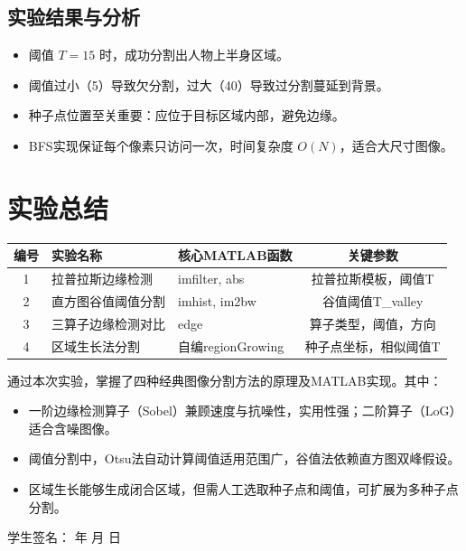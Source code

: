 \documentclass[12pt,a4paper]{article}
\begin{document}
	\subsection{实验结果与分析}
	\begin{itemize}
		\item 阈值 \(T=15\) 时，成功分割出人物上半身区域。
		\item 阈值过小（5）导致欠分割，过大（40）导致过分割蔓延到背景。
		\item 种子点位置至关重要：应位于目标区域内部，避免边缘。
		\item BFS实现保证每个像素只访问一次，时间复杂度 \(O(N)\)，适合大尺寸图像。
	\end{itemize}
	
	\section{实验总结}
	
	\begin{table}[H]
		\centering
		\begin{tabular}{cllc}
			\toprule
			编号 & 实验名称 & 核心MATLAB函数 & 关键参数 \\
			\midrule
			1 & 拉普拉斯边缘检测 & imfilter, abs & 拉普拉斯模板，阈值T \\
			2 & 直方图谷值阈值分割 & imhist, im2bw & 谷值阈值T\_valley \\
			3 & 三算子边缘检测对比 & edge & 算子类型，阈值，方向 \\
			4 & 区域生长法分割 & 自编regionGrowing & 种子点坐标，相似阈值T \\
			\bottomrule
		\end{tabular}
	\end{table}
	
	通过本次实验，掌握了四种经典图像分割方法的原理及MATLAB实现。其中：
	\begin{itemize}
		\item 一阶边缘检测算子（Sobel）兼顾速度与抗噪性，实用性强；二阶算子（LoG）适合含噪图像。
		\item 阈值分割中，Otsu法自动计算阈值适用范围广，谷值法依赖直方图双峰假设。
		\item 区域生长能够生成闭合区域，但需人工选取种子点和阈值，可扩展为多种子点分割。
	\end{itemize}
	
	\vspace{1cm}
	\begin{flushright}
		学生签名：\hspace{2cm} 年 月 日
	\end{flushright}
	
\end{document}
